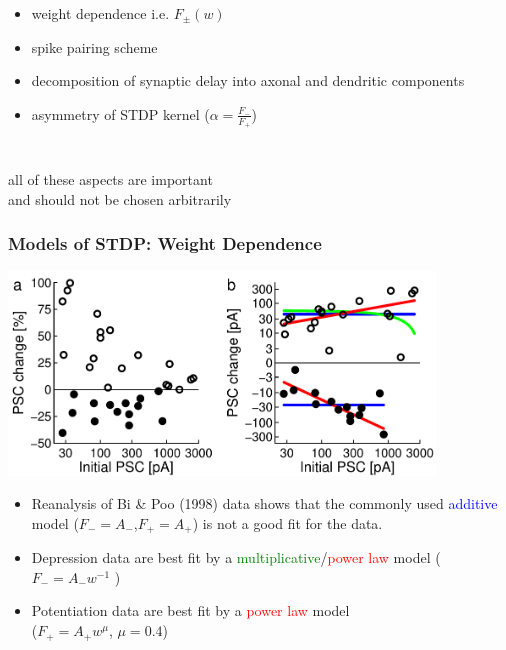 \documentclass{beamer}
\begin{document}
\begin{frame}
\begin{columns}[T]
\begin{itemize}
\setlength{\itemsep}{1.5mm}
\item weight dependence i.e. $F_{\pm}\left(w\right)$
\item spike pairing scheme
\item decomposition of synaptic delay into axonal and dendritic components
\item asymmetry of STDP kernel ($\alpha = \frac{F_{-}}{F_{+}}$)
\end{itemize}
\end{columns}
\vspace*{0.5mm}
{%
\alert{all of these aspects are important\\ and should not be chosen arbitrarily}\\
}
\end{frame}


\begin{frame}
  \frametitle{Models of STDP: Weight Dependence}
\begin{center}
\includegraphics[width=0.85\textwidth]{./figures/weight_dep}
\end{center}
\small{
\begin{itemize}
\item Reanalysis of Bi \& Poo (1998) data shows that the commonly used \textcolor{blue}{additive} model ($F_{-}=A_{-}$,$F_{+}=A_{+}$) is not a good fit for the data.
\item Depression data are best fit by a \textcolor{green}{multiplicative}/\textcolor{red}{power law} model   ($F_{-}=A_{-}w^{-1}$ ) 
\item Potentiation data are best fit by a \textcolor{red}{power law} model\\ ($F_{+}=A_{+}w^{\mu}$, $\mu=0.4$)
\end{itemize}
}
\end{frame}
\end{document}
